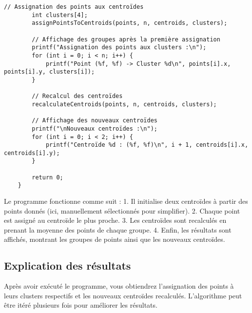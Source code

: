 \begin{lstlisting}[caption=Implémentation de l'algorithme K-means en C]
		// Assignation des points aux centroïdes
		int clusters[4];
		assignPointsToCentroids(points, n, centroids, clusters);
		
		// Affichage des groupes après la première assignation
		printf("Assignation des points aux clusters :\n");
		for (int i = 0; i < n; i++) {
			printf("Point (%f, %f) -> Cluster %d\n", points[i].x, points[i].y, clusters[i]);
		}
		
		// Recalcul des centroïdes
		recalculateCentroids(points, n, centroids, clusters);
		
		// Affichage des nouveaux centroïdes
		printf("\nNouveaux centroïdes :\n");
		for (int i = 0; i < 2; i++) {
			printf("Centroïde %d : (%f, %f)\n", i + 1, centroids[i].x, centroids[i].y);
		}
		
		return 0;
	}
\end{lstlisting}

Le programme fonctionne comme suit :
1. Il initialise deux centroïdes à partir des points donnés (ici, manuellement sélectionnés pour simplifier).
2. Chaque point est assigné au centroïde le plus proche.
3. Les centroïdes sont recalculés en prenant la moyenne des points de chaque groupe.
4. Enfin, les résultats sont affichés, montrant les groupes de points ainsi que les nouveaux centroïdes.

\subsection*{Explication des résultats}

Après avoir exécuté le programme, vous obtiendrez l'assignation des points à leurs clusters respectifs et les nouveaux centroïdes recalculés. L'algorithme peut être itéré plusieurs fois pour améliorer les résultats.



